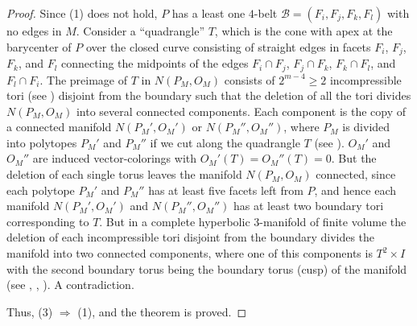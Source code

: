 \documentclass[12pt]{amsart}
\theoremstyle{definition}
\theoremstyle{remark}
\begin{document}
\begin{proof}
Since (1) does not hold, $P$ has a  least one $4$-belt $\mathcal{B}=(F_i,F_j,F_k, F_l)$ 
with no edges in $M$.  Consider a ``quadrangle'' $T$, which is the cone
with apex at the barycenter of $P$ over the closed curve consisting of straight edges 
in facets $F_i$, $F_j$, $F_k$, and  $F_l$ connecting the midpoints of the edges $F_i\cap F_j$, $F_j\cap F_k$, $F_k\cap F_l$, 
and $F_l\cap F_i$. 
The preimage of $T$ in $N(P_M,O_M)$ consists of $2^{m-4}\geqslant 2$ incompressible tori  
(see \cite[Proposition 4.23]{E22a}) disjoint from the boundary 
such that the deletion of all the tori divides $N(P_M,O_M)$ into several connected components. 
Each component is the copy of a connected manifold
$N(P_M',O_M')$ or $N(P_M'',O_M'')$, where $P_M$ is divided into polytopes $P_M'$ and $P_M''$ if we cut along the quadrangle 
$T$ (see \cite[Corollary 2.27]{E22a}). $O_M'$ and $O_M''$ are induced vector-colorings with $O_M'(T)=O_M''(T)=0$.
But the deletion of each single torus leaves the manifold $N(P_M,O_M)$ connected, since each polytope  $P_M'$ and $P_M''$
has at least five facets left from $P$,  and hence each manifold $N(P_M',O_M')$ and $N(P_M'',O_M'')$ has at least two 
boundary tori corresponding to $T$. But in a complete hyperbolic $3$-manifold of finite volume
the deletion of each incompressible tori disjoint from the boundary divides the manifold into two connected components, 
where one of this components is $T^2\times I$ with the second boundary torus being the boundary torus (cusp) 
of the manifold (see \cite[before Corollary 1.8]{H3MT}, \cite[Theorem 2.3 and before]{T82}, \cite[Section 1.6]{AFW15}). 
A contradiction. 

Thus, (3) $\Rightarrow$ (1), and the theorem is proved.
\end{proof}
\end{document}
